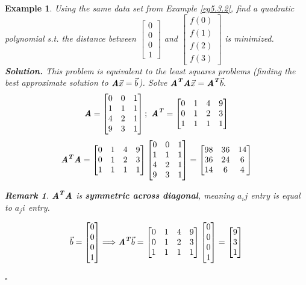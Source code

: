 \documentclass[12pt, a4paper]{article}
\newtheorem{eg}{Example}[subsection]
\newenvironment*{sol}{\indent\textbf{Solution. }}{\hfill{$\square$}\par}
\newtheorem*{rmk}{\indent Remark}
\def\T{{\textbf{\emph{T}}}}
\def\vecx{\vec{x}}
\def\vecb{\vec{b}}
\def\matrixA{\textbf{\emph{A}}}
\begin{document}
\begin{eg}
	Using the same data set from Example \ref{eg5.3.2}, find a quadratic polynomial \emph{s.t.} the distance between $\begin{bmatrix}0\\0\\0\\1\end{bmatrix}$ and $\begin{bmatrix}f(0)\\f(1)\\f(2)\\f(3)\end{bmatrix}$ is minimized. \\
	\begin{sol}
		This problem is equivalent to the least squares problems (finding the best approximate solution to $\matrixA\vecx=\vecb$). Solve $\matrixA^\T\matrixA\vecx=\matrixA^\T\vecb.$
		\[\matrixA=\begin{bmatrix}0&0&1\\1&1&1\\4&2&1\\9&3&1\end{bmatrix};\ \matrixA^\T=\begin{bmatrix}0&1&4&9\\0&1&2&3\\1&1&1&1\end{bmatrix}\]
		\[\matrixA^\T\matrixA=\begin{bmatrix}0&1&4&9\\0&1&2&3\\1&1&1&1\end{bmatrix}\begin{bmatrix}0&0&1\\1&1&1\\4&2&1\\9&3&1\end{bmatrix}=\begin{bmatrix}98&36&14\\36&24&6\\14&6&4\end{bmatrix}\]
		\begin{rmk}
			$\matrixA^\T\matrixA$ is \textbf{symmetric across diagonal}, meaning $a_ij$ entry is equal to $a_ji$ entry. 
		\end{rmk}
		\[\vecb=\begin{bmatrix}0\\0\\0\\1\end{bmatrix}\Longrightarrow\matrixA^\T\vecb=\begin{bmatrix}0&1&4&9\\0&1&2&3\\1&1&1&1\end{bmatrix}\begin{bmatrix}0\\0\\0\\1\end{bmatrix}=\begin{bmatrix}9\\3\\1\end{bmatrix}\]

\end{sol}
\end{eg}
\end{document}
